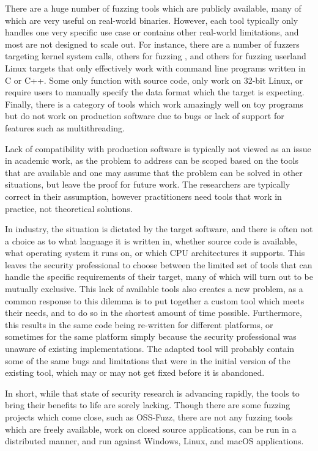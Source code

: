 There are a huge number of fuzzing tools\cite{afl,aflosx,winafl,peach22,syzkaller,ossfuzz,driller,radamsa,ni,zzuf,synfuzz,brundlefuzz,honggfuzz,kafl,vuzzer,boofuzz} which are publicly available, many of
which are very useful on real-world binaries.
However, each tool
typically only handles one very specific use case or contains other real-world limitations, and most are not designed to scale
out.  For instance, there are a number of fuzzers targeting kernel system calls\cite{syzkaller,trinity,kafl,osxfuzz}, others for
fuzzing \IOCTLs{}\cite{ioctlfuzzer,ioctlbf}, and others for fuzzing userland Linux targets that only effectively work with
command line programs written in C or C++.  Some only function with
source code, only work on 32-bit Linux\cite{vuzzer}, or require users to manually specify
the data format which the target is
expecting.\cite{peach,boofuzz}  Finally, there is a category of tools which work amazingly well
on toy programs but do not work on production software due to bugs or lack of
support for features such as multithreading.\cite{grimmdriller,angrissues}

Lack of compatibility with production software is typically not viewed as an issue in academic work, as the problem to address can be
scoped based on the tools that are available and one may assume that the problem can
be solved in other situations, but leave the proof for future work.  The researchers
are typically correct in their assumption, however practitioners need tools
that work in practice, not theoretical solutions.

In industry, the situation is dictated by the target software,
and there is often not a choice as to what language it is
written in, whether source code is available, what operating system it runs
on, or which CPU architectures it supports. This leaves the security
professional to choose between the limited set of tools that can handle the specific requirements of their target, many of which will
turn out to be mutually exclusive. This lack of available tools also creates a new problem, as a common
response to this dilemma is to put together a custom tool which meets their
needs, and to do so in the shortest amount of time possible.  Furthermore,
this results in the same code being re-written for different platforms, or
sometimes for the same platform simply because the security professional was
unaware of existing implementations.  The adapted tool will probably
contain some of the same bugs and limitations that were in the initial
version of the existing tool, which may or may not get fixed before it is
abandoned.

In short, while that state of security research is advancing rapidly, the
tools to bring their benefits to life are sorely lacking.  Though there are some
fuzzing projects which come close, such as OSS-Fuzz,\cite{ossfuzz} there
are not any fuzzing tools which are freely available, work on closed source applications,
can be run in a distributed manner, and run against Windows, Linux, and macOS applications.
